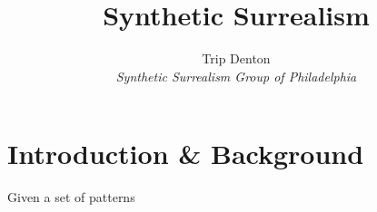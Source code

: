 \documentclass{article}
\begin{document}
\date{}


\title{Synthetic Surrealism }

\author{
Trip Denton  \\
        \emph{Synthetic Surrealism Group of Philadelphia}  %
}

 

\maketitle

\thispagestyle{empty}

\begin{abstract}

  
\end{abstract}
  
\section{Introduction \& Background}
\label{sec:intro}
\vspace{-0.1in}
Given a set of patterns
\end{document}
